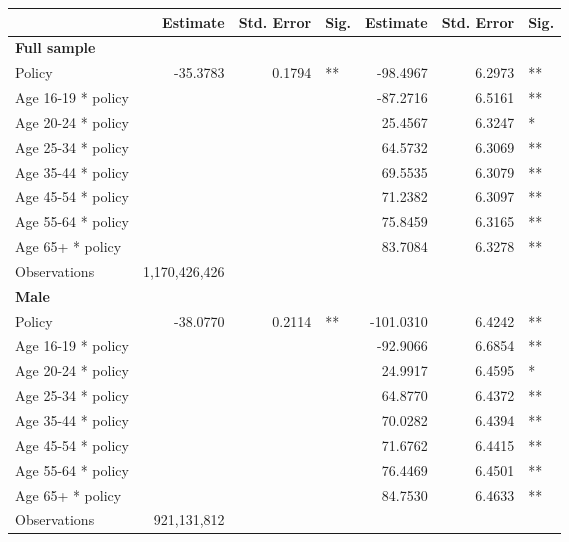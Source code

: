 
\begin{table}%
\centering 
\begin{tabular}{l r r l r r l} 

\hline 
 
 & Estimate & Std. Error & Sig. & Estimate & Std. Error & Sig. \\ 

\hline 
 
\textbf{Full sample} \\ 

Policy             &  -35.3783        &  0.1794       &   **       &  -98.4967        &  6.2973       &   **       \\ 
Age 16-19 * policy           & & &  &  -87.2716        &  6.5161       &   **       \\ 
Age 20-24 * policy           & & &  &  25.4567        &  6.3247       &    *       \\ 
Age 25-34 * policy           & & &  &  64.5732        &  6.3069       &   **       \\ 
Age 35-44 * policy           & & &  &  69.5535        &  6.3079       &   **       \\ 
Age 45-54 * policy           & & &  &  71.2382        &  6.3097       &   **       \\ 
Age 55-64 * policy           & & &  &  75.8459        &  6.3165       &   **       \\ 
Age 65+ * policy           & & &  &  83.7084        &  6.3278       &   **       \\ 
Observations & 1,170,426,426 \\ 


\hline 

\textbf{Male} \\ 

Policy             &  -38.0770        &  0.2114       &   **       &  -101.0310        &  6.4242       &   **       \\ 
Age 16-19 * policy           & & &  &  -92.9066        &  6.6854       &   **       \\ 
Age 20-24 * policy           & & &  &  24.9917        &  6.4595       &    *       \\ 
Age 25-34 * policy           & & &  &  64.8770        &  6.4372       &   **       \\ 
Age 35-44 * policy           & & &  &  70.0282        &  6.4394       &   **       \\ 
Age 45-54 * policy           & & &  &  71.6762        &  6.4415       &   **       \\ 
Age 55-64 * policy           & & &  &  76.4469        &  6.4501       &   **       \\ 
Age 65+ * policy           & & &  &  84.7530        &  6.4633       &   **       \\ 
Observations & 921,131,812 \\ 



\end{tabular}
\end{table}
